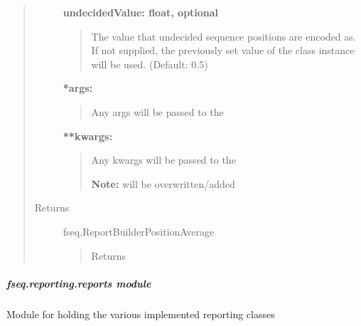 \documentclass[letterpaper,10pt,english]{sphinxmanual}
\begin{document}
\begin{fulllineitems}
\begin{fulllineitems}
\begin{quote}
\begin{description}
\textbf{undecidedValue: float, optional}
\begin{quote}

The value that undecided sequence positions are encoded as.
If not supplied, the previously set value of the class instance
will be used.
(Default: 0.5)
\end{quote}

\textbf{*args:}
\begin{quote}

Any args will be passed to the 
\end{quote}

\textbf{**kwargs:}
\begin{quote}

Any kwargs will be passed to the 

\textbf{Note:}  will be overwritten/added
\end{quote}

\item[{Returns}] \leavevmode
fseq.ReportBuilderPositionAverage
\begin{quote}

Returns 
\end{quote}

\end{description}\end{quote}

\end{fulllineitems}


\begin{fulllineitems}
\label{fseq.reporting:fseq.reporting.report_builder.ReportBuilderPositionAverage.undecidedValue}
\end{fulllineitems}


\end{fulllineitems}



\subparagraph{fseq.reporting.reports module}
\label{fseq.reporting:module-fseq.reporting.reports}\label{fseq.reporting:fseq-reporting-reports-module}
Module for holding the various implemented reporting classes
\end{document}
